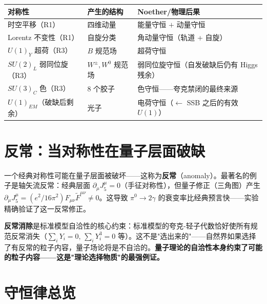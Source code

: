 \begin{center}
\footnotesize
\begin{tabular}{p{3.5cm}p{4.5cm}p{6cm}}
\toprule
\textbf{对称性} & \textbf{产生的结构} & \textbf{Noether/物理后果} \\
\midrule
时空平移（R1）& 四维动量 & 能量守恒 $+$ 动量守恒 \\
Lorentz 不变性（R1）& 自旋分类 & 角动量守恒（轨道 + 自旋）\\
$U(1)_Y$ 超荷（R3）& $B$ 规范场 & 超荷守恒 \\
$SU(2)_L$ 弱同位旋（R3）& $W^\pm, W^0$ 规范场 & 弱同位旋守恒（自发破缺后仍有 Higgs 残余）\\
$SU(3)_C$ 色（R3）& 8 个胶子 & 色守恒——夸克禁闭的最终来源 \\
$U(1)_{EM}$（破缺后剩余）& 光子 & 电荷守恒（$\leftarrow$ SSB 之后的有效 $U(1)$）\\
\bottomrule
\end{tabular}
\end{center}


\section{反常：当对称性在量子层面破缺}

一个经典对称性可能在量子层面被破坏——这称为\textbf{反常}（anomaly）。最著名的例子是轴矢流反常：经典层面 $\partial_\mu J_5^\mu = 0$（手征对称性），但量子修正（三角图）产生 $\partial_\mu J_5^\mu = (e^2/16\pi^2)F_{\mu\nu}\tilde{F}^{\mu\nu} \neq 0$。这导致 $\pi^0 \to 2\gamma$ 的衰变率比经典预言快——实验精确验证了这一反常修正。

\textbf{反常消除}是标准模型自洽性的核心约束：标准模型的夸克-轻子代数恰好使所有规范反常消失（$\sum_i Y_i = 0$, $\sum_i Y_i^3 = 0$ 等）。这不是"选出来的"——自然界如果选择了有反常的粒子内容，量子场论将是不自洽的。\textbf{量子理论的自洽性本身约束了可能的粒子内容——这是"理论选择物质"的最强例证。}

\section{守恒律总览}

